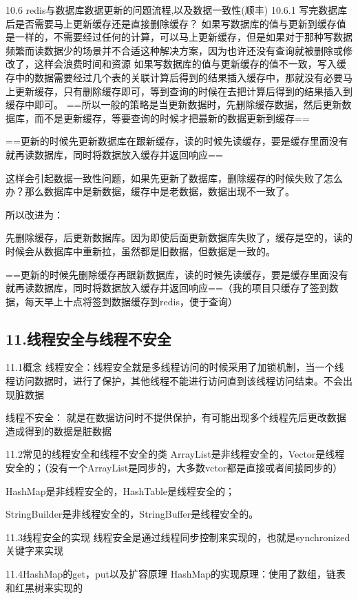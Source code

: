 \documentclass[UTF8]{ctexart}
\begin{document}
10.6 redis与数据库数据更新的问题流程,以及数据一致性(顺丰)
10.6.1 写完数据库后是否需要马上更新缓存还是直接删除缓存？
如果写数据库的值与更新到缓存值是一样的，不需要经过任何的计算，可以马上更新缓存，但是如果对于那种写数据频繁而读数据少的场景并不合适这种解决方案，因为也许还没有查询就被删除或修改了，这样会浪费时间和资源
如果写数据库的值与更新缓存的值不一致，写入缓存中的数据需要经过几个表的关联计算后得到的结果插入缓存中，那就没有必要马上更新缓存，只有删除缓存即可，等到查询的时候在去把计算后得到的结果插入到缓存中即可。
==所以一般的策略是当更新数据时，先删除缓存数据，然后更新数据库，而不是更新缓存，等要查询的时候才把最新的数据更新到缓存==

==更新的时候先更新数据库在跟新缓存，读的时候先读缓存，要是缓存里面没有就再读数据库，同时将数据放入缓存并返回响应==

这样会引起数据一致性问题，如果先更新了数据库，删除缓存的时候失败了怎么办？那么数据库中是新数据，缓存中是老数据，数据出现不一致了。

所以改进为：

先删除缓存，后更新数据库。因为即使后面更新数据库失败了，缓存是空的，读的时候会从数据库中重新拉，虽然都是旧数据，但数据是一致的。

==更新的时候先删除缓存再跟新数据库，读的时候先读缓存，要是缓存里面没有就再读数据库，同时将数据放入缓存并返回响应==（我的项目只缓存了签到数据，每天早上十点将签到数据缓存到redis，便于查询）

\subsection{11.线程安全与线程不安全}

11.1概念
线程安全：线程安全就是多线程访问的时候采用了加锁机制，当一个线程访问数据时，进行了保护，其他线程不能进行访问直到该线程访问结束。不会出现脏数据

线程不安全： 就是在数据访问时不提供保护，有可能出现多个线程先后更改数据造成得到的数据是脏数据

11.2常见的线程安全和线程不安全的类
ArrayList是非线程安全的，Vector是线程安全的；（没有一个ArrayList是同步的，大多数vctor都是直接或者间接同步的）

HashMap是非线程安全的，HashTable是线程安全的；

StringBuilder是非线程安全的，StringBuffer是线程安全的。

11.3线程安全的实现
线程安全是通过线程同步控制来实现的，也就是synchronized关键字来实现

11.4HashMap的get，put以及扩容原理
HashMap的实现原理：使用了数组，链表和红黑树来实现的
\end{document}
